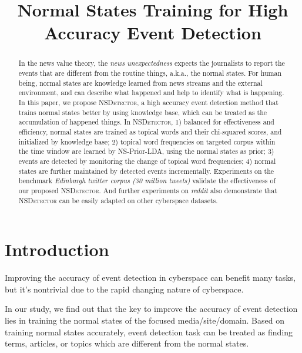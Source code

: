 \documentclass[conference,compsoc]{IEEEtran}
\begin{document}
\title{Normal States Training for High Accuracy Event Detection}

\maketitle
\begin{abstract}
In the news value theory, the \textit{news unexpectedness} expects the journalists to report the events that are different from the routine things, a.k.a., the normal states. 
For human being, normal states are knowledge learned from news streams and the external environment, and can describe what happened and help to identify what is happening.
In this paper, we propose \textsc{NSDetector}, a high accuracy event detection method that trains normal states better by using knowledge base, which can be treated as the accumulation of happened things. 
In \textsc{NSDetector}, 1) balanced for effectiveness and efficiency, normal states are trained as topical words and their chi-squared scores, and initialized by knowledge base; 2) topical word frequencies on targeted corpus within the time window are learned by NS-Prior-LDA, using the normal states as prior; 3) events are detected by monitoring the change of topical word frequencies; 4) normal states are further maintained by detected events incrementally.
Experiments on the benchmark \textit{Edinburgh twitter corpus (30 million tweets)} validate the effectiveness of our proposed \textsc{NSDetector}.
And further experiments on \textit{reddit} also demonstrate that \textsc{NSDetector} can be easily adapted on other cyberspace datasets.
\end{abstract}


\section{Introduction}
Improving the accuracy of event detection in cyberspace can benefit many tasks, but it's nontrivial due to the rapid changing nature of cyberspace.

In our study, we find out that the key to improve the accuracy of event detection lies in training the normal states of the focused media/site/domain. Based on training normal states accurately, event detection task can be treated as finding terms, articles, or topics which are different from the normal states. 
\end{document}
